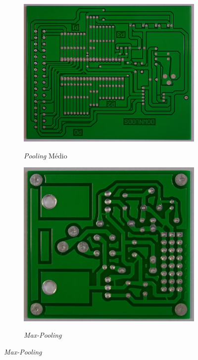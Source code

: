 \begin{figure}[h!]
    \centering
    \caption{Exemplos de funções utilizadas para operação de \textit{pooling}.}
    \begin{subfigure}[H]{\textwidth}
        \centering
        \caption{\textit{Pooling} Médio}
        \includegraphics[scale=0.08]{img/img-resultados-hripcb-aberto.jpg}
        \label{fig:resultados-hripc-1}
    \end{subfigure}
    \begin{subfigure}[H]{\textwidth}
        \centering
        \caption{\textit{Max-Pooling}}
        \includegraphics[scale=0.08]{img/img-resultados-hripcb-curto.jpg}
        \label{fig:resultados-hripc-2}
    \end{subfigure}
    \label{fig:resultados-hripc}
\end{figure}
